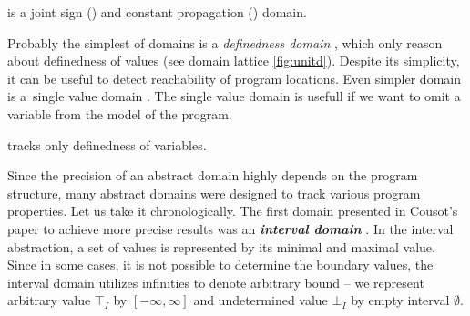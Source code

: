 \begin{marginfigure}%
    \centering
{}
    \caption{ is a joint sign () and constant propagation () domain.}
    \label{fig:cpsign}%
\end{marginfigure}%

Probably the simplest of domains is a \emph{definedness domain} , which only
reason about definedness of values (see domain lattice \autoref{fig:unitd}).
Despite its simplicity, it can be useful to detect reachability of program
locations. Even simpler domain is a~single value domain . The single
value domain is usefull if we want to omit a variable from the model of the
program.

\begin{marginfigure}%
    \centering
    \caption{ tracks only definedness of variables.}
    \label{fig:unitd}%
\end{marginfigure}%

Since the precision of an abstract domain highly depends on the program
structure, many abstract domains were designed to track various program
properties. Let us take it chronologically. The first domain presented in
Cousot's paper \cite{Cousot1977} to achieve more precise results was an
\textbf{\emph{interval domain}} . In the interval abstraction, a set of values
is represented by its minimal and maximal value. Since in some cases, it is not
possible to determine the boundary values, the interval domain utilizes
infinities to denote arbitrary bound -- we represent arbitrary value
$\top_{\textit{I}}$ by $[-\infty, \infty]$ and undetermined value $\bot_{\textit{I}}$
by empty interval $\emptyset$.

